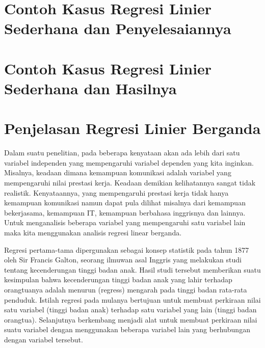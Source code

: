 \section {Contoh Kasus Regresi Linier Sederhana dan Penyelesaiannya}
\section {Contoh Kasus Regresi Linier Sederhana dan Hasilnya}

\section{Penjelasan Regresi Linier Berganda}
\par Dalam suatu penelitian, pada beberapa kenyataan akan ada lebih dari satu variabel independen yang mempengaruhi variabel dependen yang kita inginkan. Misalnya, keadaan dimana kemampuan komunikasi adalah variabel yang mempengaruhi nilai prestasi kerja. Keadaan demikian kelihatannya sangat tidak realistik. Kenyataannya, yang mempengaruhi prestasi kerja tidak hanya kemampuan komunikasi namun dapat pula dilihat misalnya dari kemampuan bekerjasama, kemampuan IT, kemampuan berbahasa inggrisnya dan lainnya. Untuk menganalisis beberapa variabel yang mempengaruhi satu variabel lain maka kita menggunakan analisis regresi linear berganda.      
\par Regresi pertama-tama dipergunakan sebagai konsep statistik pada tahun 1877 oleh Sir Francis Galton, seorang ilmuwan asal Inggris yang melakukan studi tentang kecenderungan tinggi badan anak. Hasil studi tersebut memberikan suatu kesimpulan bahwa kecenderungan tinggi badan anak yang lahir terhadap orangtuanya adalah menurun (regress) mengarah pada tinggi badan rata-rata penduduk. Istilah regresi pada mulanya bertujuan untuk membuat perkiraan nilai satu variabel (tinggi badan anak) terhadap satu variabel yang lain (tinggi badan orangtua). Selanjutnya berkembang menjadi alat untuk membuat perkiraan nilai suatu variabel dengan menggunakan beberapa variabel lain yang berhubungan dengan variabel tersebut. 
